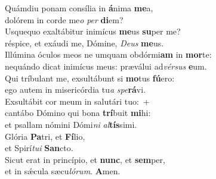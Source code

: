 \evenverse Quámdiu ponam consília in \textbf{á}nima \textbf{me}a,~\*\\
\evenverse dolórem in corde me\textit{o} \textit{per} \textbf{di}em?\\
\oddverse Usquequo exaltábitur inimícus \textbf{me}us \textbf{su}per me?~\*\\
\oddverse réspice, et exáudi me, Dómine, \textit{De}\textit{us} \textbf{me}us.\\
\evenverse Illúmina óculos meos ne umquam obdórmi\textbf{am} in \textbf{mor}te:~\*\\
\evenverse nequándo dicat inimícus meus: præválui ad\textit{vér}\textit{sus} \textbf{e}um.\\
\oddverse Qui tríbulant me, exsultábunt si \textbf{mo}tus \textbf{fú}ero:~\*\\
\oddverse ego autem in misericórdia tu\textit{a} \textit{spe}\textbf{rá}vi.\\
\evenverse Exsultábit cor meum in salutári tuo:~+\\
\evenverse  cantábo Dómino qui bona \textbf{trí}buit \textbf{mi}hi:~\*\\
\evenverse et psallam nómini Dómi\textit{ni} \textit{al}\textbf{tís}simi.\\
\oddverse Glória \textbf{Pa}tri, et \textbf{Fí}lio,~\*\\
\oddverse et Spirí\textit{tu}\textit{i} \textbf{San}cto.\\
\evenverse Sicut erat in princípio, et \textbf{nunc}, et \textbf{sem}per,~\*\\
\evenverse et in sǽcula sæcu\textit{ló}\textit{rum}. \textbf{A}men.\\
